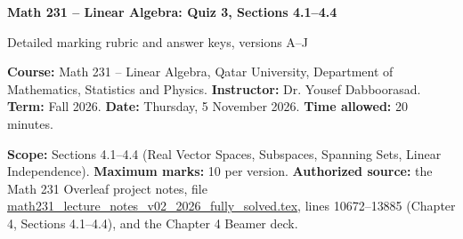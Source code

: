 \documentclass[11pt,a4paper]{article}
\begin{document}
{\LARGE\bfseries\textcolor{Brand}{Math 231 -- Linear Algebra: Quiz 3, Sections 4.1--4.4}}\par
{\large Detailed marking rubric and answer keys, versions A--J}\par\vspace{2mm}
\textbf{Course:} Math 231 -- Linear Algebra, Qatar University, Department of Mathematics, Statistics and Physics. \quad \textbf{Instructor:} Dr. Yousef Dabboorasad. \quad \textbf{Term:} Fall 2026. \quad \textbf{Date:} Thursday, 5 November 2026. \quad \textbf{Time allowed:} 20 minutes.\par
\textbf{Scope:} Sections 4.1--4.4 (Real Vector Spaces, Subspaces, Spanning Sets, Linear Independence). \quad \textbf{Maximum marks:} 10 per version. \quad \textbf{Authorized source:} the Math 231 Overleaf project notes, file \url{math231_lecture_notes_v02_2026_fully_solved.tex}, lines 10672--13885 (Chapter 4, Sections 4.1--4.4), and the Chapter 4 Beamer deck.\par
\end{document}
